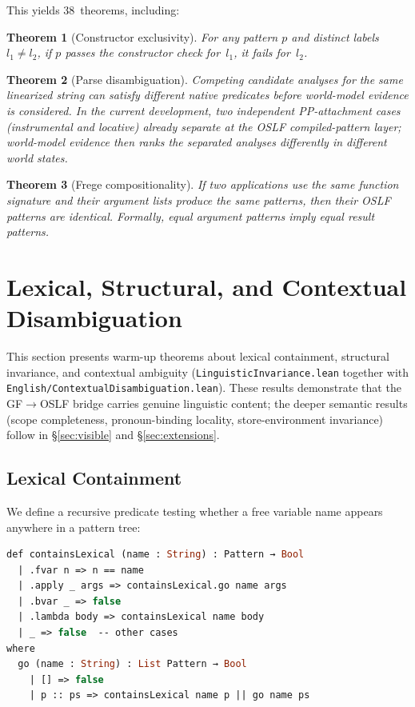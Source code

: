 \documentclass[11pt]{article}
\newtheorem{theorem}{Theorem}
\newcommand{\code}[1]{\texttt{#1}}
\newcommand{\OSLF}{\textup{OSLF}}
\newcommand{\GF}{\textup{GF}}
\begin{document}
This yields 38~theorems, including:

\begin{theorem}[Constructor exclusivity]
For any pattern $p$ and distinct labels $l_1 \neq l_2$, if $p$ passes the
constructor check for~$l_1$, it fails for~$l_2$.
\end{theorem}

\begin{theorem}[Parse disambiguation]
Competing candidate analyses for the same linearized string can satisfy different
native predicates before world-model evidence is considered.  In the current
development, two independent PP-attachment cases (instrumental and locative)
already separate at the OSLF compiled-pattern layer; world-model evidence
then ranks the separated analyses differently in different world states.
\end{theorem}

\begin{theorem}[Frege compositionality]
If two applications use the same function signature and their argument lists
produce the same patterns, then their \OSLF{} patterns are identical.
Formally, equal argument patterns imply equal result patterns.
\end{theorem}

\section{Lexical, Structural, and Contextual Disambiguation}
\label{sec:invariance}

This section presents warm-up theorems about lexical containment,
structural invariance, and contextual ambiguity
(\code{LinguisticInvariance.lean} together with
\code{English/ContextualDisambiguation.lean}).  These results demonstrate that the
\GF{}$\to$\OSLF{} bridge carries genuine linguistic content; the deeper
semantic results (scope completeness, pronoun-binding locality,
store-environment invariance) follow in \S\ref{sec:visible} and
\S\ref{sec:extensions}.

\subsection{Lexical Containment}

We define a recursive predicate testing whether a free variable name
appears anywhere in a pattern tree:

\begin{lstlisting}[language=ml,caption={Recursive lexical containment}]
def containsLexical (name : String) : Pattern → Bool
  | .fvar n => n == name
  | .apply _ args => containsLexical.go name args
  | .bvar _ => false
  | .lambda body => containsLexical name body
  | _ => false  -- other cases
where
  go (name : String) : List Pattern → Bool
    | [] => false
    | p :: ps => containsLexical name p || go name ps
\end{lstlisting}
\end{document}
